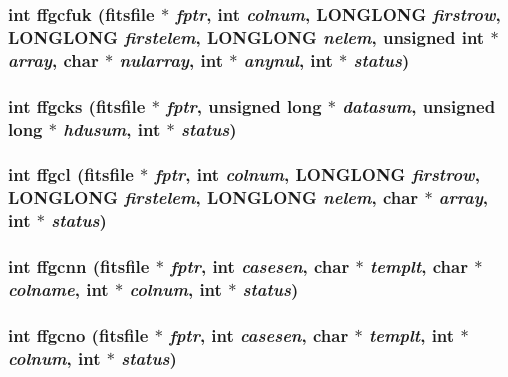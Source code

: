 \subsubsection{\setlength{\rightskip}{0pt plus 5cm}int ffgcfuk (\bf{fitsfile} $\ast$ {\em fptr}, int {\em colnum}, \bf{LONGLONG} {\em firstrow}, \bf{LONGLONG} {\em firstelem}, \bf{LONGLONG} {\em nelem}, unsigned int $\ast$ {\em array}, char $\ast$ {\em nularray}, int $\ast$ {\em anynul}, int $\ast$ {\em status})}\label{src_2fitsio_8h_33717e73b5c9e15644b128a5546102ba}


\subsubsection{\setlength{\rightskip}{0pt plus 5cm}int ffgcks (\bf{fitsfile} $\ast$ {\em fptr}, unsigned long $\ast$ {\em datasum}, unsigned long $\ast$ {\em hdusum}, int $\ast$ {\em status})}\label{src_2fitsio_8h_ac550539cbf9b960d2f9e4c8619a50d5}


\subsubsection{\setlength{\rightskip}{0pt plus 5cm}int ffgcl (\bf{fitsfile} $\ast$ {\em fptr}, int {\em colnum}, \bf{LONGLONG} {\em firstrow}, \bf{LONGLONG} {\em firstelem}, \bf{LONGLONG} {\em nelem}, char $\ast$ {\em array}, int $\ast$ {\em status})}\label{src_2fitsio_8h_d208fea0ab2ac53456307cdc890b07ca}


\subsubsection{\setlength{\rightskip}{0pt plus 5cm}int ffgcnn (\bf{fitsfile} $\ast$ {\em fptr}, int {\em casesen}, char $\ast$ {\em templt}, char $\ast$ {\em colname}, int $\ast$ {\em colnum}, int $\ast$ {\em status})}\label{src_2fitsio_8h_64f9be429b2bc87b2c632dc87da8c647}


\subsubsection{\setlength{\rightskip}{0pt plus 5cm}int ffgcno (\bf{fitsfile} $\ast$ {\em fptr}, int {\em casesen}, char $\ast$ {\em templt}, int $\ast$ {\em colnum}, int $\ast$ {\em status})}\label{src_2fitsio_8h_b16df66331ffdbe091b4bf638c2fb3fb}


